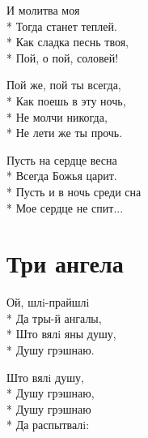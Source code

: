 \medskip

\begin{minipage}{\linewidth}
И молитва моя\\*
Тогда станет теплей.\\*
Как сладка песнь твоя,\\*
Пой, о пой, соловей!\\
\end{minipage}\par\medskip\nobreak

\medskip

\begin{minipage}{\linewidth}
Пой же, пой ты всегда,\\*
Как поешь в эту ночь,\\*
Не молчи никогда,\\*
Не лети же ты прочь.\\
\end{minipage}\par\medskip\nobreak

\medskip

\begin{minipage}{\linewidth}
Пусть на сердце весна\\*
Всегда Божья царит.\\*
Пусть и в ночь среди сна\\*
Мое сердце не спит...\\
\end{minipage}

\vspace{\fill}\newpage

\section{Три ангела}
\label{song:Три_ангела}

\medskip

\begin{minipage}{\linewidth}
Ой, шлi-прайшлi\\*
Да тры-й ангалы,\\*
Што вялi яны душу,\\*
Душу грэшнаю.\\
\end{minipage}\par\medskip\nobreak

\medskip

\begin{minipage}{\linewidth}
Што вялi душу,\\*
Душу грэшнаю,\\*
Душу грэшнаю\\*
Да распытвалi:\\
\end{minipage}\par\medskip\nobreak

